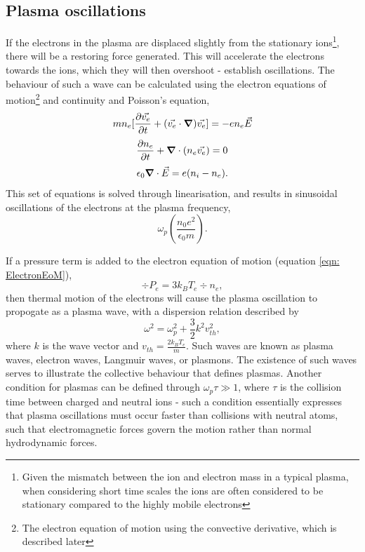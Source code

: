 \subsection{Plasma oscillations}
If the electrons in the plasma are displaced slightly from the stationary ions\footnote{Given the mismatch between the ion and electron mass in a typical plasma, when considering short time scales the ions are often considered to be stationary compared to the highly mobile electrons}, there will be a restoring force generated. This will accelerate the electrons towards the ions, which they will then overshoot - establish oscillations. The behaviour of such a wave can be calculated using the electron equations of motion\footnote{The electron equation of motion using the convective derivative, which is described later} and continuity and Poisson's equation,
\begin{equation} m n_e [\frac{\partial\vec{v_e}}{\partial t} + (\vec{v_e} \cdot \grad)\vec{v_e}] = -e n_e \vec{E} \end{equation}
\begin{equation} \frac{\partial n_e}{\partial t} + \grad \cdot (n_e \vec{v_e}) = 0 \label{eqn: ElectronEoM} \end{equation}
\begin{equation} \epsilon_0 \grad \cdot \vec{E} = e(n_i - n_e). \end{equation}
This set of equations is solved through linearisation, and results in sinusoidal oscillations of the electrons at the plasma frequency, 
\begin{equation} \omega_p \left( \frac{n_0 e^2}{\epsilon_0 m}\right). \label{eqn: PlasmaFrequency} \end{equation}

If a pressure term is added to the electron equation of motion (equation \ref{eqn: ElectronEoM}),
\begin{equation} \div P_e = 3 k_B T_e \div n_e, \end{equation}
then thermal motion of the electrons will cause the plasma oscillation to propogate as a plasma wave, with a dispersion relation described by
\begin{equation} \omega^2 = \omega_p^2 + \frac{3}{2} k^2 v_{th}^2, \end{equation}
where $k$ is the wave vector and $v_{th} = \frac{2 k_B T_e}{m}$. Such waves are known as plasma waves, electron waves, Langmuir waves, or plasmons. The existence of such waves serves to illustrate the collective behaviour that defines plasmas. Another condition for plasmas can be defined through $\omega_p \tau \gg 1$, where $\tau$ is the collision time between charged and neutral ions - such a condition essentially expresses that plasma oscillations must occur faster than collisions with neutral atoms, such that electromagnetic forces govern the motion rather than normal hydrodynamic forces.

